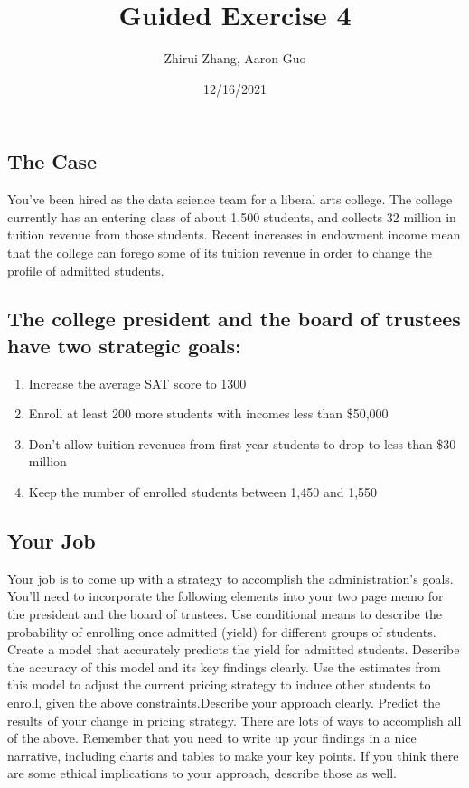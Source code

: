 \documentclass[
]{article}
\title{Guided Exercise 4}
\author{Zhirui Zhang, Aaron Guo}
\date{12/16/2021}
\providecommand{\tightlist}{%
  \setlength{\itemsep}{0pt}\setlength{\parskip}{0pt}}
\begin{document}
\maketitle

\hypertarget{the-case}{%
\subsection{The Case}\label{the-case}}

You've been hired as the data science team for a liberal arts college.
The college currently has an entering class of about 1,500 students, and
collects 32 million in tuition revenue from those students. Recent
increases in endowment income mean that the college can forego some of
its tuition revenue in order to change the profile of admitted students.

\hypertarget{the-college-president-and-the-board-of-trustees-have-two-strategic-goals}{%
\subsection{The college president and the board of trustees have two
strategic
goals:}\label{the-college-president-and-the-board-of-trustees-have-two-strategic-goals}}

\begin{enumerate}
\def\labelenumi{\arabic{enumi}.}
\tightlist
\item
  Increase the average SAT score to 1300
\item
  Enroll at least 200 more students with incomes less than \$50,000
\item
  Don't allow tuition revenues from first-year students to drop to less
  than \$30 million
\item
  Keep the number of enrolled students between 1,450 and 1,550
\end{enumerate}

\hypertarget{your-job}{%
\subsection{Your Job}\label{your-job}}

Your job is to come up with a strategy to accomplish the
administration's goals. You'll need to incorporate the following
elements into your two page memo for the president and the board of
trustees. Use conditional means to describe the probability of enrolling
once admitted (yield) for different groups of students. Create a model
that accurately predicts the yield for admitted students. Describe the
accuracy of this model and its key findings clearly. Use the estimates
from this model to adjust the current pricing strategy to induce other
students to enroll, given the above constraints.Describe your approach
clearly. Predict the results of your change in pricing strategy. There
are lots of ways to accomplish all of the above. Remember that you need
to write up your findings in a nice narrative, including charts and
tables to make your key points. If you think there are some ethical
implications to your approach, describe those as well.
\end{document}
